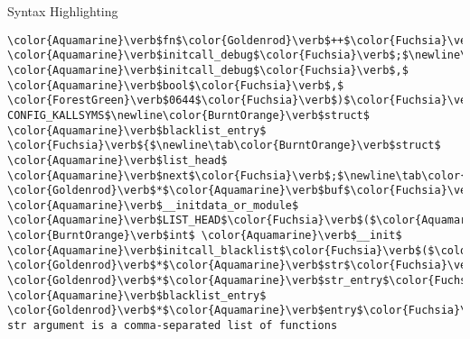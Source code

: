 \begin{frame}{Syntax Highlighting}
\begin{verbatim}
\color{Aquamarine}\verb$fn$\color{Goldenrod}\verb$++$\color{Fuchsia}\verb$)$\newline\tab\tab\color{Fuchsia}\verb$($\color{Goldenrod}\verb$*$\color{Aquamarine}\verb$fn$\color{Fuchsia}\verb$)$\color{Fuchsia}\verb$($\color{Fuchsia}\verb$)$\color{Fuchsia}\verb$;$\newline\color{Gray}\verb$#endif$\newline\color{Fuchsia}\verb$}$\newline\newline\color{Aquamarine}\verb$bool$ \color{Aquamarine}\verb$initcall_debug$\color{Fuchsia}\verb$;$\newline\color{Aquamarine}\verb$core_param$\color{Fuchsia}\verb$($\color{Aquamarine}\verb$initcall_debug$\color{Fuchsia}\verb$,$ \color{Aquamarine}\verb$initcall_debug$\color{Fuchsia}\verb$,$ \color{Aquamarine}\verb$bool$\color{Fuchsia}\verb$,$ \color{ForestGreen}\verb$0644$\color{Fuchsia}\verb$)$\color{Fuchsia}\verb$;$\newline\newline\color{Gray}\verb$#ifdef CONFIG_KALLSYMS$\newline\color{BurntOrange}\verb$struct$ \color{Aquamarine}\verb$blacklist_entry$ \color{Fuchsia}\verb${$\newline\tab\color{BurntOrange}\verb$struct$ \color{Aquamarine}\verb$list_head$ \color{Aquamarine}\verb$next$\color{Fuchsia}\verb$;$\newline\tab\color{BurntOrange}\verb$char$ \color{Goldenrod}\verb$*$\color{Aquamarine}\verb$buf$\color{Fuchsia}\verb$;$\newline\color{Fuchsia}\verb$}$\color{Fuchsia}\verb$;$\newline\newline\color{BurntOrange}\verb$static$ \color{Aquamarine}\verb$__initdata_or_module$ \color{Aquamarine}\verb$LIST_HEAD$\color{Fuchsia}\verb$($\color{Aquamarine}\verb$blacklisted_initcalls$\color{Fuchsia}\verb$)$\color{Fuchsia}\verb$;$\newline\newline\color{BurntOrange}\verb$static$ \color{BurntOrange}\verb$int$ \color{Aquamarine}\verb$__init$ \color{Aquamarine}\verb$initcall_blacklist$\color{Fuchsia}\verb$($\color{BurntOrange}\verb$char$ \color{Goldenrod}\verb$*$\color{Aquamarine}\verb$str$\color{Fuchsia}\verb$)$\newline\color{Fuchsia}\verb${$\newline\tab\color{BurntOrange}\verb$char$ \color{Goldenrod}\verb$*$\color{Aquamarine}\verb$str_entry$\color{Fuchsia}\verb$;$\newline\tab\color{BurntOrange}\verb$struct$ \color{Aquamarine}\verb$blacklist_entry$ \color{Goldenrod}\verb$*$\color{Aquamarine}\verb$entry$\color{Fuchsia}\verb$;$\newline\newline\tab\color{Rhodamine}\begin{verbatim}/* str argument is a comma-separated list of functions 
\end{verbatim}
\end{frame}
